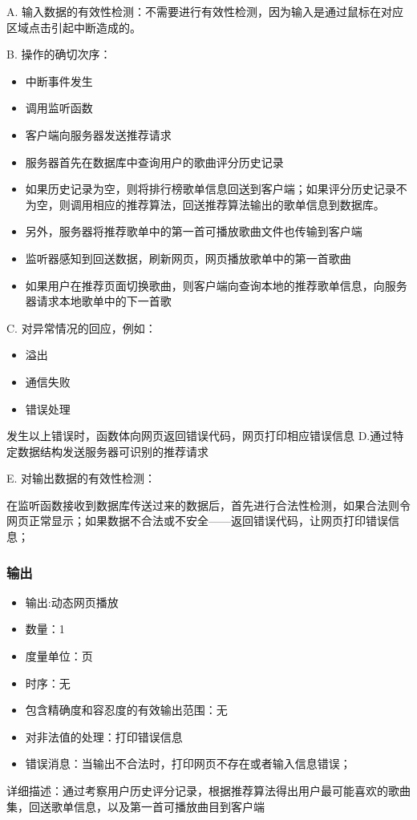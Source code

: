    
   A. 输入数据的有效性检测：不需要进行有效性检测，因为输入是通过鼠标在对应区域点击引起中断造成的。
   
   B. 操作的确切次序：
   \begin{adjustwidth}{2cm}{1cm}\qquad
	   \begin{itemize}
		   \item 中断事件发生
		   \item 调用监听函数
		   \item 客户端向服务器发送推荐请求
		   \item 服务器首先在数据库中查询用户的歌曲评分历史记录
		   \item 如果历史记录为空，则将排行榜歌单信息回送到客户端；如果评分历史记录不为空，则调用相应的推荐算法，回送推荐算法输出的歌单信息到数据库。
		   \item 另外，服务器将推荐歌单中的第一首可播放歌曲文件也传输到客户端
		   \item 监听器感知到回送数据，刷新网页，网页播放歌单中的第一首歌曲
		   \item 如果用户在推荐页面切换歌曲，则客户端向查询本地的推荐歌单信息，向服务器请求本地歌单中的下一首歌
	   \end{itemize}		
   \end{adjustwidth}
	
   
   C. 对异常情况的回应，例如：
   \begin{adjustwidth}{2cm}{1cm}\qquad
	   \begin{itemize}
		   \item 溢出
		   \item 通信失败
		   \item 错误处理
	   \end{itemize}		
   \end{adjustwidth}
   
	   发生以上错误时，函数体向网页返回错误代码，网页打印相应错误信息
   D.通过特定数据结构发送服务器可识别的推荐请求
		   
   E. 对输出数据的有效性检测：
   
   在监听函数接收到数据库传送过来的数据后，首先进行合法性检测，如果合法则令网页正常显示；如果数据不合法或不安全——返回错误代码，让网页打印错误信息；
   
   \subsubsection{输出}
   \begin{itemize}
	   \item	输出:动态网页播放
	   \item	数量：1
	   \item	度量单位：页
	   \item	时序：无
	   \item	包含精确度和容忍度的有效输出范围：无
	   \item	对非法值的处理：打印错误信息
	   \item	错误消息：当输出不合法时，打印网页不存在或者输入信息错误；
	  \end{itemize}
	  详细描述：通过考察用户历史评分记录，根据推荐算法得出用户最可能喜欢的歌曲集，回送歌单信息，以及第一首可播放曲目到客户端






